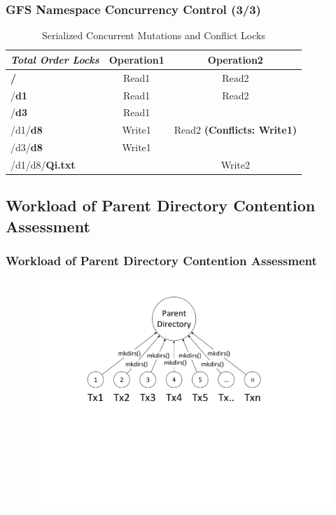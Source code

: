 \documentclass{beamer}
\begin{document}
\begin{frame}
	\frametitle{GFS Namespace Concurrency Control (3/3)}
		\begin{table}[ht]
			\centering
			\begin{tabular}{|l|c|c|}
				\hline
				\textbf{\textit{Total Order Locks}}             & \textbf{Operation1} & \textbf{Operation2}                    \\ \hline
				\textbf{\color{red}/}             & Read1      & Read2                         \\ \hline
				/\textbf{\color{red}d1}           & Read1      & Read2                         \\ \hline
				/\textbf{\color{red}d3}           & Read1      & ~                             \\ \hline
				/d1/\textbf{\color{red}d8}        & Write1     & Read2 \textbf{(Conflicts: Write1)} \\ \hline
				/d3/\textbf{\color{red}d8}       & Write1     & ~                             \\ \hline
				/d1/d8/\textbf{\color{red}Qi.txt} & ~          & Write2                        \\ \hline
			\end{tabular}
			\caption{Serialized Concurrent Mutations and Conflict Locks}
		\end{table}
\end{frame}

\subsection{Workload of Parent Directory Contention Assessment}
\begin{frame}
	\frametitle{Workload of Parent Directory Contention Assessment}
	\begin{figure}[ht]
		\centering
		\includegraphics[width=\linewidth]{figs/ww.pdf}
	\end{figure}
\end{frame}
\end{document}
